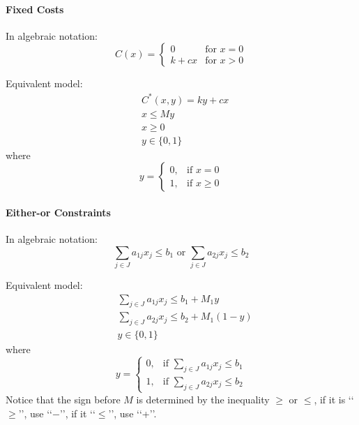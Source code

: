         \paragraph{Fixed Costs}
             In algebraic notation: 
            \begin{equation*}
                C(x) = \begin{cases} 0 & \text{for } x=0 \\ k + cx & \text{for } x > 0 \end{cases} 
            \end{equation*}
            
            Equivalent model:
            \begin{align*}
                & C^*(x, y) = ky+cx\\
                & x \le My  \\
                & x \ge 0 \\
                & y \in \{0, 1\} 
            \end{align*}
            where
            \begin{equation*}y=\begin{cases}0, & \text{if }x=0 \\ 1, & \text{if }x\ge 0\end{cases} \end{equation*}
        
        \paragraph{Either-or Constraints}
             In algebraic notation: 
            \begin{equation*}
                \sum_{j\in J} a_{1j} x_j \le b_1 \text{ or } \sum_{j\in J} a_{2j} x_j \le b_2 
            \end{equation*}
            
            Equivalent model:
            \begin{align*}
                & \sum_{j\in J} a_{1j} x_j \le b_1 + M_1y  \\
                & \sum_{j\in J} a_{2j} x_j \le b_2 + M_1(1-y)  \\
                & y \in \{0, 1\} 
            \end{align*}
            where
            \begin{equation*}y=\begin{cases}0, & \text{if }\sum_{j\in J} a_{1j} x_j \le b_1 \\ 1, & \text{if } \sum_{j\in J} a_{2j} x_j \le b_2\end{cases} \end{equation*}
            Notice that the sign before $M$ is determined by the inequality $\ge$ or $\le$, if it is \lq\lq{}$\ge$\rq\rq{}, use \lq\lq{}$-$\rq\rq{}, if it \lq\lq{}$\le$\rq\rq{}, use \lq\lq{}+\rq\rq{}.
        
